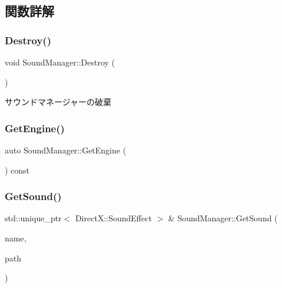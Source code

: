 \subsection{関数詳解}
\mbox{\label{class_sound_manager_abf0d473d0a31323c8e74684976b08e7f}} 
\subsubsection{\texorpdfstring{Destroy()}{Destroy()}}
{\footnotesize\ttfamily void Sound\+Manager\+::\+Destroy (\begin{DoxyParamCaption}{ }\end{DoxyParamCaption})}



サウンドマネージャーの破棄 

\mbox{\label{class_sound_manager_a5a575ac572eb0b50b3bb48b879a1a7e6}} 
\subsubsection{\texorpdfstring{Get\+Engine()}{GetEngine()}}
{\footnotesize\ttfamily auto Sound\+Manager\+::\+Get\+Engine (\begin{DoxyParamCaption}{ }\end{DoxyParamCaption}) const\hspace{0.3cm}{\ttfamily [inline]}}

\mbox{\label{class_sound_manager_ab97083f065caec6d4f59c246b1978faf}} 
\subsubsection{\texorpdfstring{Get\+Sound()}{GetSound()}}
{\footnotesize\ttfamily std\+::unique\+\_\+ptr$<$ Direct\+X\+::\+Sound\+Effect $>$ \& Sound\+Manager\+::\+Get\+Sound (\begin{DoxyParamCaption}\item[{std\+::string}]{name,  }\item[{W\+C\+H\+AR $\ast$}]{path }\end{DoxyParamCaption})}



